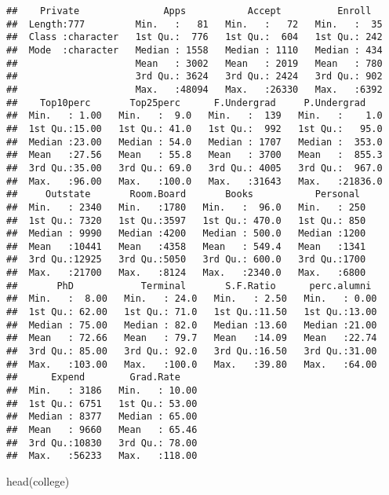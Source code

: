 \documentclass[
]{article}
\newenvironment{Shaded}{\begin{snugshade}}{\end{snugshade}}
\newcommand{\FunctionTok}[1]{\textcolor[rgb]{0.00,0.00,0.00}{#1}}
\newcommand{\NormalTok}[1]{#1}
\begin{document}
\begin{verbatim}
##    Private               Apps           Accept          Enroll    
##  Length:777         Min.   :   81   Min.   :   72   Min.   :  35  
##  Class :character   1st Qu.:  776   1st Qu.:  604   1st Qu.: 242  
##  Mode  :character   Median : 1558   Median : 1110   Median : 434  
##                     Mean   : 3002   Mean   : 2019   Mean   : 780  
##                     3rd Qu.: 3624   3rd Qu.: 2424   3rd Qu.: 902  
##                     Max.   :48094   Max.   :26330   Max.   :6392  
##    Top10perc       Top25perc      F.Undergrad     P.Undergrad     
##  Min.   : 1.00   Min.   :  9.0   Min.   :  139   Min.   :    1.0  
##  1st Qu.:15.00   1st Qu.: 41.0   1st Qu.:  992   1st Qu.:   95.0  
##  Median :23.00   Median : 54.0   Median : 1707   Median :  353.0  
##  Mean   :27.56   Mean   : 55.8   Mean   : 3700   Mean   :  855.3  
##  3rd Qu.:35.00   3rd Qu.: 69.0   3rd Qu.: 4005   3rd Qu.:  967.0  
##  Max.   :96.00   Max.   :100.0   Max.   :31643   Max.   :21836.0  
##     Outstate       Room.Board       Books           Personal   
##  Min.   : 2340   Min.   :1780   Min.   :  96.0   Min.   : 250  
##  1st Qu.: 7320   1st Qu.:3597   1st Qu.: 470.0   1st Qu.: 850  
##  Median : 9990   Median :4200   Median : 500.0   Median :1200  
##  Mean   :10441   Mean   :4358   Mean   : 549.4   Mean   :1341  
##  3rd Qu.:12925   3rd Qu.:5050   3rd Qu.: 600.0   3rd Qu.:1700  
##  Max.   :21700   Max.   :8124   Max.   :2340.0   Max.   :6800  
##       PhD            Terminal       S.F.Ratio      perc.alumni   
##  Min.   :  8.00   Min.   : 24.0   Min.   : 2.50   Min.   : 0.00  
##  1st Qu.: 62.00   1st Qu.: 71.0   1st Qu.:11.50   1st Qu.:13.00  
##  Median : 75.00   Median : 82.0   Median :13.60   Median :21.00  
##  Mean   : 72.66   Mean   : 79.7   Mean   :14.09   Mean   :22.74  
##  3rd Qu.: 85.00   3rd Qu.: 92.0   3rd Qu.:16.50   3rd Qu.:31.00  
##  Max.   :103.00   Max.   :100.0   Max.   :39.80   Max.   :64.00  
##      Expend        Grad.Rate     
##  Min.   : 3186   Min.   : 10.00  
##  1st Qu.: 6751   1st Qu.: 53.00  
##  Median : 8377   Median : 65.00  
##  Mean   : 9660   Mean   : 65.46  
##  3rd Qu.:10830   3rd Qu.: 78.00  
##  Max.   :56233   Max.   :118.00
\end{verbatim}

\begin{Shaded}
\begin{Highlighting}[]
\FunctionTok{head}\NormalTok{(college)}
\end{Highlighting}
\end{Shaded}
\end{document}
